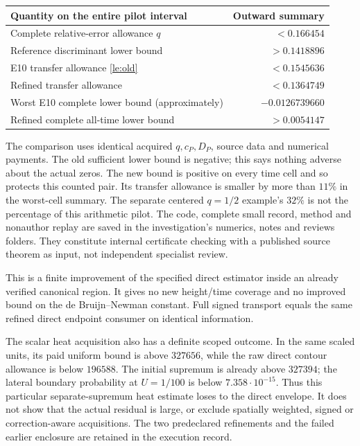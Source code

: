 \begin{center}
\begin{tabular}{@{}lr@{}}
\toprule
Quantity on the entire pilot interval & Outward summary \\
\midrule
Complete relative-error allowance $q$ & $<0.166454$ \\
Reference discriminant lower bound & $>0.1418896$ \\
E10 transfer allowance \eqref{le:old} & $<0.1545636$ \\
Refined transfer allowance & $<0.1364749$ \\
Worst E10 complete lower bound (approximately) & $-0.0126739660$ \\
Refined complete all-time lower bound & $>0.0054147$ \\
\bottomrule
\end{tabular}
\end{center}

The comparison uses identical acquired $q,c_P,D_P$, source data and
numerical payments. The old sufficient lower bound is negative; this
says nothing adverse about the actual zeros. The new bound is positive
on every time cell and so protects this counted pair. Its transfer
allowance is smaller by more than $11\%$ in the worst-cell summary.
The separate centered $q=1/2$ example's $32\%$ is not the percentage of
this arithmetic pilot. The code, complete small record, method and
nonauthor replay are saved in the investigation's numerics, notes and
reviews folders. They constitute internal certificate checking with a
published source theorem as input, not independent specialist review.

This is a finite improvement of the specified direct estimator inside
an already verified canonical region. It gives no new height/time
coverage and no improved bound on the de Bruijn--Newman constant. Full
signed transport equals the same refined direct endpoint consumer on
identical information.

The scalar heat acquisition also has a definite scoped outcome. In the
same scaled units, its paid uniform bound is above $327656$, while the
raw direct contour allowance is below $196588$. The initial supremum is
already above $327394$; the lateral boundary probability at $U=1/100$
is below $7.358\cdot10^{-15}$. Thus this particular separate-supremum
heat estimate loses to the direct envelope. It does not show that the
actual residual is large, or exclude spatially weighted, signed or
correction-aware acquisitions. The two predeclared refinements and the
failed earlier enclosure are retained in the execution record.

